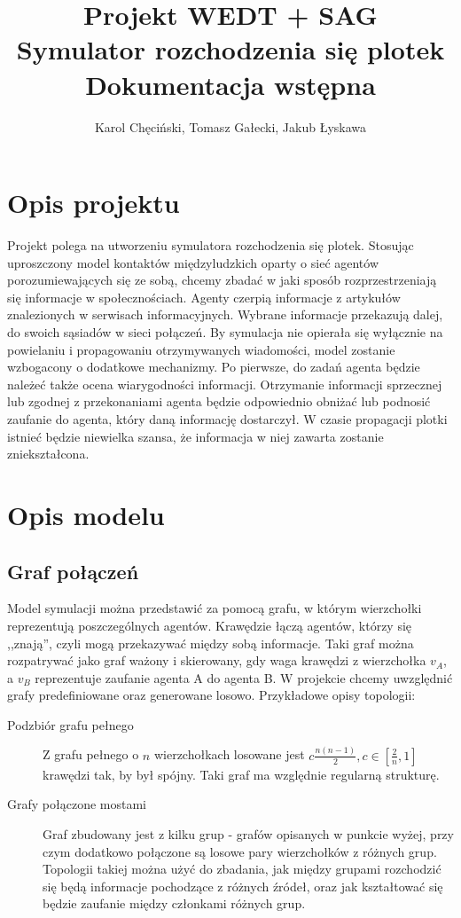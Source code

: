 \documentclass{article}
\title{Projekt WEDT + SAG \\ Symulator rozchodzenia się plotek \\ Dokumentacja wstępna}
\author{Karol Chęciński, Tomasz Gałecki, Jakub Łyskawa}
\begin{document}
	\maketitle
	\section{Opis projektu}
		Projekt polega na utworzeniu symulatora rozchodzenia się plotek. Stosując uproszczony model kontaktów międzyludzkich oparty o sieć agentów porozumiewających się ze sobą, chcemy zbadać w jaki sposób rozprzestrzeniają się informacje w społecznościach. Agenty czerpią informacje z artykułów znalezionych w serwisach informacyjnych. Wybrane informacje przekazują dalej, do swoich sąsiadów w sieci połączeń. 
		By symulacja nie opierała się wyłącznie na powielaniu i propagowaniu otrzymywanych wiadomości, model zostanie wzbogacony o dodatkowe mechanizmy. Po pierwsze, do zadań agenta będzie należeć także ocena wiarygodności informacji. Otrzymanie informacji sprzecznej lub zgodnej z przekonaniami agenta będzie odpowiednio obniżać lub podnosić zaufanie do agenta, który daną informację dostarczył. W czasie propagacji plotki istnieć będzie niewielka szansa, że informacja w niej zawarta zostanie zniekształcona. 
	\section{Opis modelu}
	\subsection{Graf połączeń}
		Model symulacji można przedstawić za pomocą grafu, w którym wierzchołki reprezentują poszczególnych agentów. Krawędzie łączą agentów, którzy się ,,znają'', czyli mogą przekazywać między sobą informacje. Taki graf można rozpatrywać jako graf ważony i skierowany, gdy waga krawędzi z wierzchołka $v_A$, a $v_B$ reprezentuje zaufanie agenta A do agenta B.
		W projekcie chcemy uwzględnić grafy predefiniowane oraz generowane losowo. Przykładowe opisy topologii:
		\begin{description}
		\item[Podzbiór grafu pełnego]
		Z grafu pełnego o $n$ wierzchołkach losowane jest $c\frac{n(n-1)}{2}, c \in [\frac{2}{n}, 1]$ krawędzi tak, by był spójny. Taki graf ma względnie regularną strukturę.
		\item[Grafy połączone mostami]
		Graf zbudowany jest z kilku grup - grafów opisanych w punkcie wyżej, przy czym dodatkowo połączone są losowe pary wierzchołków z różnych grup. Topologii takiej można użyć do zbadania, jak między grupami rozchodzić się będą informacje pochodzące z różnych źródeł, oraz jak kształtować się będzie zaufanie między członkami różnych grup.
		\end{description}
\end{document}
